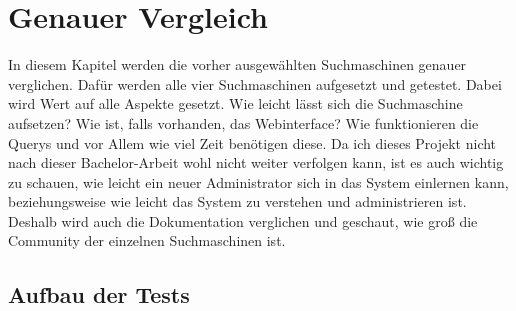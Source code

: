 \chapter{Genauer Vergleich}

In diesem Kapitel werden die vorher ausgewählten Suchmaschinen genauer verglichen. Dafür werden alle vier Suchmaschinen aufgesetzt und getestet. Dabei wird Wert auf alle Aspekte gesetzt. Wie leicht lässt sich die Suchmaschine aufsetzen? Wie ist, falls vorhanden, das Webinterface? Wie funktionieren die Querys und vor Allem wie viel Zeit benötigen diese. Da ich dieses Projekt nicht nach dieser Bachelor-Arbeit wohl nicht weiter verfolgen kann, ist es auch wichtig zu schauen, wie leicht ein neuer Administrator sich in das System einlernen kann, beziehungsweise wie leicht das System zu verstehen und administrieren ist. Deshalb wird auch die Dokumentation verglichen und geschaut, wie groß die Community der einzelnen Suchmaschinen ist. 

\section{Aufbau der Tests}